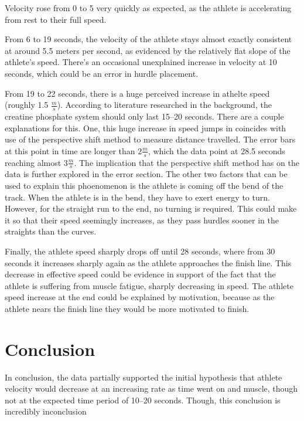 \documentclass[index]{subfiles}
\begin{document}
Velocity rose from 0 to 5 very quickly as expected, as the athlete is accelerating from rest to their full speed.

From 6 to 19 seconds, the velocity of the athlete stays almost exactly consistent at around 5.5 meters per second, as evidenced by the relatively flat slope of the athlete's speed.  There's an occasional unexplained increase in velocity at 10 seconds, which could be an error in hurdle placement.

From 19 to 22 seconds, there is a huge perceived increase in athelte speed (roughly 1.5 \(\frac{m}{s}\)). According to literature researched in the background,  \parencite{martin1997better} the creatine phosphate system should only last 15--20 seconds. There are a couple explanations for this. One, this huge increase in speed jumps in coincides with use of the perspective shift method to measure distance travelled. The error bars at this point in time are longer than \(2\frac{m}{s}\), which the data point at 28.5 seconds reaching almost \(3\frac{m}{s}\). The implication that the perspective shift method has on the data is further explored in the error section. The other two factors that can be used to explain this phoenomenon is the athlete is coming off the bend of the track. When the athlete is in the bend, they have to exert energy to turn. However, for the straight run to the end, no turning is required. This could make it so that their speed seemingly increases, as they pass hurdles sooner in the straights than the curves.

Finally, the athlete speed sharply drops off until 28 seconds, where from 30 seconds it increases sharply again as the athlete approaches the finish line. This decrease in effective speed could be evidence in support of the fact that the athlete is suffering from muscle fatigue, sharply decreasing in speed. The athlete speed increase at the end could be explained by motivation, because as the athlete nears the finish line they would be more motivated to finish.

\section{Conclusion}

In conclusion, the data partially supported the initial hypothesis that athlete velocity would decrease at an increasing rate as time went on and muscle, though not at the expected time period of 10--20 seconds. Though, this conclusion is incredibly inconclusion
\end{document}
